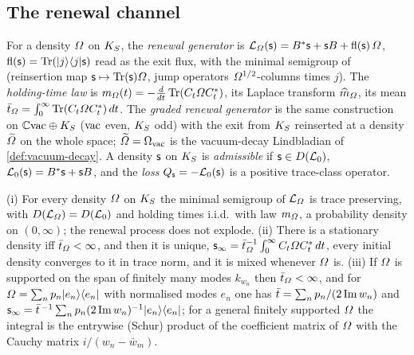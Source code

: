 \subsection{The renewal channel}

\begin{definition}
\label{def:rebound-renewal-generator}
For a density $\varOmega$ on $K_S$, the \emph{renewal generator} is
$\mathcal L_{\varOmega}(\mathsf s) = B^{*}\mathsf s + \mathsf sB + \mathrm{fl}(\mathsf s)\,\varOmega$, $\mathrm{fl}(\mathsf s) =
\operatorname{Tr}(|j\rangle\langle j|\mathsf s)$ read as the exit flux, with the minimal semigroup of
\cite{siemon2017unbounded} (reinsertion map $\mathsf s\mapsto\operatorname{Tr}(\mathsf s)\varOmega$, jump operators
$\varOmega^{1/2}$-columns times $j$). The \emph{holding-time law} is $m_{\varOmega}(t) =
-\tfrac{d}{dt}\operatorname{Tr}(C_t\varOmega C_t^{*})$, its Laplace transform $\widehat m_{\varOmega}$, its mean
$\bar t_{\varOmega} = \int_0^\infty\operatorname{Tr}(C_t\varOmega C_t^{*})\,dt$. The \emph{graded renewal generator} is the
same construction on $\mathbb C\mathrm{vac}\oplus K_S$ ($\mathrm{vac}$ even, $K_S$ odd) with the exit from $K_S$
reinserted at a density $\widetilde{\varOmega}$ on the whole space; $\widetilde{\varOmega} = \Omega_{\mathrm{vac}}$ is the
vacuum-decay Lindbladian of \cref{def:vacuum-decay}. A density $\mathsf s$ on $K_S$ is \emph{admissible}
if $\mathsf s\in D(\mathcal L_0)$, $\mathcal L_0(\mathsf s) = B^{*}\mathsf s+\mathsf sB$, and the
\emph{loss} $Q_\mathsf s = -\mathcal L_0(\mathsf s)$ is a positive trace-class operator.
\end{definition}

\begin{theorem}
\label{thm:rebound-renewal}
(i) For every density $\varOmega$ on $K_S$ the minimal semigroup of $\mathcal L_{\varOmega}$ is trace
preserving, with $D(\mathcal L_{\varOmega}) = D(\mathcal L_0)$ and holding times i.i.d.\ with law $m_{\varOmega}$,
a probability density on $(0,\infty)$; the renewal process does not explode. (ii) There is a stationary
density iff $\bar t_{\varOmega}<\infty$, and then it is unique, $\mathsf s_\infty = \bar t_{\varOmega}^{-1}\int_0^\infty
C_t\varOmega C_t^{*}\,dt$, every initial density converges to it in trace norm, and it is mixed
whenever $\varOmega$ is. (iii) If $\varOmega$ is supported on the span of finitely many modes $k_{w_n}$ then
$\bar t_{\varOmega}<\infty$, and for $\varOmega = \sum_n p_n|e_n\rangle\langle e_n|$ with normalised modes $e_n$
one has $\bar t = \sum_n p_n/(2\operatorname{Im} w_n)$ and $\mathsf s_\infty = \bar t^{\,-1}\sum_n p_n(2\operatorname{Im} w_n)^{-1}
|e_n\rangle\langle e_n|$; for a general finitely supported $\varOmega$ the integral is the entrywise
(Schur) product of the coefficient matrix of $\varOmega$ with the Cauchy matrix $i/(w_n-\bar w_m)$.
\end{theorem}

